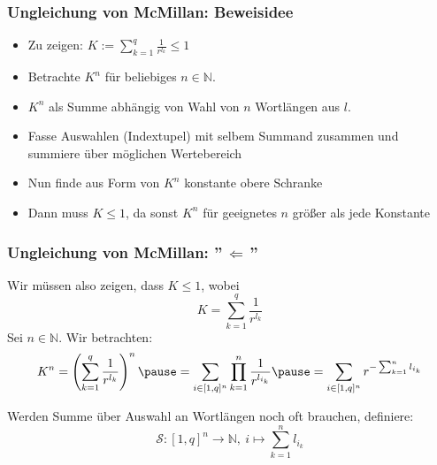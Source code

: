 \documentclass{beamer}
\begin{document}
\begin{frame}[t]
    \frametitle{Ungleichung von McMillan: Beweisidee}
    \begin{itemize}
        \setlength\itemsep{1em}
        \item Zu zeigen: $K := \sum_{k=1}^{q} \frac{1}{r^{l_k}} \leq 1$
        \pause
        \item Betrachte $K^n$ für beliebiges $n \in \mathbb{N}$.
        \pause
        \item $K^n$ als Summe abhängig von Wahl von $n$ Wortlängen aus $l$.
        \pause
        \item Fasse Auswahlen (Indextupel) mit selbem Summand zusammen
            und summiere über möglichen Wertebereich
        \pause
        \item Nun finde aus Form von $K^n$ konstante obere Schranke
        \pause
        \item Dann muss $K \leq 1$, da sonst $K^n$ für geeignetes $n$ größer
            als jede Konstante
    \end{itemize}
\end{frame}

\begin{frame}[t]
    \frametitle{Ungleichung von McMillan: ''$\,\Longleftarrow\,$''}
        Wir müssen also zeigen, dass $K \leq 1$, wobei
        $$
            K = \sum_{k=1}^{q} \frac{1}{r^{l_k}}
        $$
        \pause
        Sei $n \in \mathbb{N}$. Wir betrachten:
        $$
            K^n = \left(\sum_{k=1}^{q} \frac{1}{r^{l_k}}\right)^n
            \pause
            = \sum_{i \in [1,q]^n} \prod_{k=1}^{n} \frac{1}{r^{l_{i_k}}}
            \pause
            = \sum_{i\in [1,q]^n} r^{-\sum_{k=1}^{n} l_{i_k}}
        $$\pause

        Werden Summe über Auswahl an Wortlängen noch oft brauchen, definiere:
        $$
            \mathcal{S}: [1,q]^n \to \mathbb{N},\ i \mapsto \sum_{k=1}^{n} l_{i_k}
        $$
\end{frame}
\end{document}
